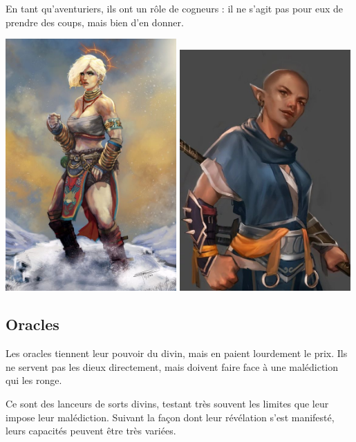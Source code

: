 \documentclass[10pt,a4paper]{book}
\begin{document}
En tant qu'aventuriers, ils ont un rôle de cogneurs : il ne s'agit pas pour eux de prendre des coups, mais bien d'en donner.

\includegraphics[width=0.49\textwidth]{moine 1}
\includegraphics[width=0.49\textwidth]{moine 2}
\subsection{Oracles}
Les oracles tiennent leur pouvoir du divin, mais en paient lourdement le prix. Ils ne servent pas les dieux directement, mais doivent faire face à une malédiction qui les ronge.

Ce sont des lanceurs de sorts divins, testant très souvent les limites que leur impose leur malédiction. Suivant la façon dont leur révélation s'est manifesté, leurs capacités peuvent être très variées.
\end{document}
